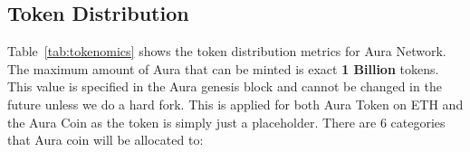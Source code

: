 \documentclass[11pt, titlepage]{article}
\begin{document}
\subsection{Token Distribution}
\begin{table}[ht]
\centering
{}
\caption{Aura token distribution design}
\label{tab:tokenomics}
\end{table}

Table~\ref{tab:tokenomics} shows the token distribution metrics for Aura Network. The maximum amount of Aura that can be minted is exact \textbf{1 Billion} tokens. This value is specified in the Aura genesis block and cannot be changed in the future unless we do a hard fork. This is applied for both Aura Token on ETH and the Aura Coin as the token is simply just a placeholder. There are 6 categories that Aura coin will be allocated to:
\end{document}

